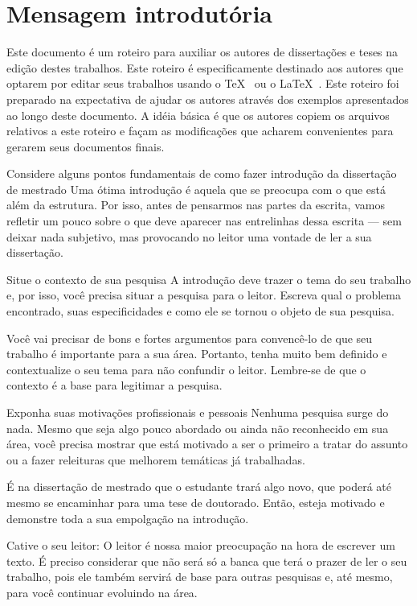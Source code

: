\section{Mensagem introdutória}
Este documento é um roteiro para auxiliar os autores de
dissertações e teses na edição destes trabalhos.
Este roteiro é especificamente destinado aos autores que optarem
por editar seus trabalhos usando o \TeX\ \cite{knuth:tex,texbook} ou o \LaTeX\ \cite{lamport:latex,latexbook}.
Este roteiro foi preparado na expectativa de ajudar os autores
através dos exemplos apresentados ao longo deste documento. A
idéia básica é que os autores copiem os arquivos
relativos a este roteiro e façam as modificações que
acharem convenientes para gerarem seus documentos finais.

Considere alguns pontos fundamentais de como fazer introdução da dissertação de mestrado
Uma ótima introdução é aquela que se preocupa com o que está além da estrutura. Por isso, antes de pensarmos nas partes da escrita, vamos refletir um pouco sobre o que deve aparecer nas entrelinhas dessa escrita — sem deixar nada subjetivo, mas provocando no leitor uma vontade de ler a sua dissertação.

Situe o contexto de sua pesquisa
A introdução deve trazer o tema do seu trabalho e, por isso, você precisa situar a pesquisa para o leitor. Escreva qual o problema encontrado, suas especificidades e como ele se tornou o objeto de sua pesquisa.

Você vai precisar de bons e fortes argumentos para convencê-lo de que seu trabalho é importante para a sua área. Portanto, tenha muito bem definido e contextualize o seu tema para não confundir o leitor. Lembre-se de que o contexto é a base para legitimar a pesquisa.

Exponha suas motivações profissionais e pessoais
Nenhuma pesquisa surge do nada. Mesmo que seja algo pouco abordado ou ainda não reconhecido em sua área, você precisa mostrar que está motivado a ser o primeiro a tratar do assunto ou a fazer releituras que melhorem temáticas já trabalhadas.

É na dissertação de mestrado que o estudante trará algo novo, que poderá até mesmo se encaminhar para uma tese de doutorado. Então, esteja motivado e demonstre toda a sua empolgação na introdução.

Cative o seu leitor: O leitor é nossa maior preocupação na hora de escrever um texto. É preciso considerar que não será só a banca que terá o prazer de ler o seu trabalho, pois ele também servirá de base para outras pesquisas e, até mesmo, para você continuar evoluindo na área.

